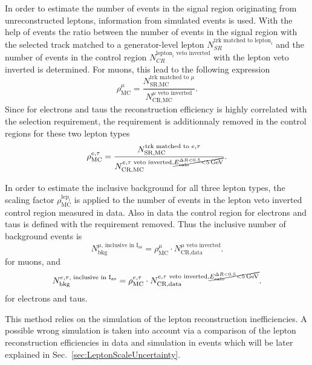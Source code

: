 In order to estimate the number of events in the signal region originating from unreconstructed leptons, information from simulated events is used.
With the help of \WJets events the ratio between the number of events in the signal region with the selected track matched to a generator-level lepton $N_{SR}^{\text{trk matched to lepton}_i}$
 and the number of events in the control region $N_{CR}^{\text{lepton}_i\text{ veto inverted}}$ with the lepton veto inverted is determined.
For muons, this lead to the following expression
\begin{equation*}
\rho_{\text{MC}}^{\mu} = \frac{N_{\text{SR,MC}}^{\text{trk matched to }\mu}}{N_{\text{CR,MC}}^{\mu \text{ veto inverted}}}.
\end{equation*}
Since for electrons and taus the reconstruction efficiency is highly correlated with the \ecalo selection requirement, the \ecalo requirement is additionnaly removed in the control regions for these two lepton types 
\begin{equation*}
\rho_{\text{MC}}^{e,\tau} = \frac{N_{\text{SR,MC}}^{\text{trk matched to }e,\tau}}{N_{\text{CR,MC}}^{e,\tau\text{ veto inverted}, \cancel{E^{\Delta R<0.5}_{\text{calo}}<5\,\text{Ge}\kern-0.06667em\text{V}}}}.
\end{equation*}

In order to estimate the inclusive background for all three lepton types, the scaling factor $\rho_{\text{MC}}^{\text{lep}_i}$ is applied to the number of events in the lepton veto inverted control region measured in data.
Also in data the control region for electrons and taus is defined with the \ecalo requirement removed. 
Thus the inclusive number of background events is 
\begin{equation*}
N^{\mu \text{, inclusive in I$_{\text{as}}$}}_{\text{bkg}} = \rho_{\text{MC}}^{\mu} \cdot N_{\text{CR,data}}^{\mu\text{ veto inverted}}.
\end{equation*}
for muons, and 
\begin{equation*}
N^{e,\tau\text{, inclusive in I$_{\text{as}}$}}_{\text{bkg}} = \rho_{\text{MC}}^{e,\tau} \cdot N_{\text{CR,data}}^{e,\tau\text{ veto inverted}, \cancel{E^{\Delta R<0.5}_{\text{calo}}<5\,\text{Ge}\kern-0.06667em\text{V}}}.
\end{equation*}
for electrons and taus.

This method relies on the simulation of the lepton reconstruction inefficiencies.
A possible wrong simulation is taken into account via a comparison of the lepton reconstruction efficiencies in data and simulation in \Zlep events which will be later explained in Sec.~\ref{sec:LeptonScaleUncertainty}.

